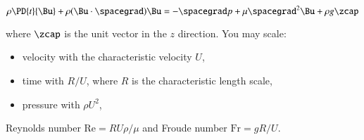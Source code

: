 \begin{Exercise}[
title={Nondimensionalise N-S equation},
label={problem:fluids:ps3:q2}
]
\begin{equation}\label{eqn:continuumProblemSet3:230}
\rho \PD{t}{\Bu} + \rho (\Bu \cdot \spacegrad) \Bu = - \spacegrad p + \mu \spacegrad^2 \Bu + \rho g \zcap
\end{equation}

where $\zcap$ is the unit vector in the $z$ direction.  You may scale:

\begin{itemize}
\item velocity with the characteristic velocity $U$,
\item time with $R/U$, where $R$ is the characteristic length scale,
\item pressure with $\rho U^2$,
\end{itemize}

Reynolds number $\text{Re} = R U \rho/ \mu$ and Froude number $\text{Fr} = g R/U$.
\end{Exercise}

